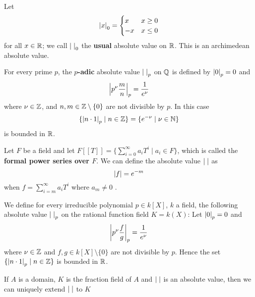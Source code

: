 \documentclass[11pt]{article}
\begin{document}
\begin{examplle}[]
Let
\begin{equation*}
\abs{x}_0=
\begin{cases}
x&x\ge 0\\
-x&x\le 0
\end{cases}
\end{equation*}
for all \(x\in\mathbb{R}\); we call \(\abs{\;}_0\) the \textbf{usual} absolute value on \(\mathbb{R}\). This is an
archimedean absolute value.
\end{examplle}

\begin{examplle}[]
For every prime \(p\), the \textbf{\(p\)-adic} absolute value \(\abs{\;}_p\) on \(\mathbb{Q}\) is defined by
\(\abs{0}_p=0\) and
\begin{equation*}
\abs{p^\nu\frac{m}{n}}_p=\frac{1}{e^\nu}
\end{equation*}
where \(\nu\in\mathbb{Z}\), and \(n,m\in\mathbb{Z}\setminus\{0\}\) are not divisible
by \(p\). In this case
\begin{equation*}
\{\abs{n\cdot 1}_p\mid n\in\Z\}=\{e^{-\nu}\mid\nu\in\N\}
\end{equation*}
is bounded in \(\mathbb{R}\).
\end{examplle}

\begin{examplle}[]
Let \(F\) be a field and let \(F[[T]]=\{\sum_{i=0}^\infty a_iT^i\mid a_i\in F\}\), which is called
the \textbf{formal power series over \(F\)}. We can define the absolute value \(\abs{\;}\) as
\begin{equation*}
\abs{f}=e^{-m}
\end{equation*}
when \(f=\sum_{i=m}^\infty a_iT^i\) where \(a_m\neq 0\) .
\end{examplle}

\begin{examplle}[]
\label{e1.1.4}
We define for every irreducible polynomial \(p\in k[X]\), \(k\) a field, the following absolute
value \(\abs{\;}_p\) on the rational function field \(K=k(X)\):
Let \(\abs{0}_p=0\) and
\begin{equation*}
\abs{p^\nu\frac{f}{g}}_p=\frac{1}{e^\nu}
\end{equation*}
where \(\nu\in\mathbb{Z}\) and \(f,g\in k[X]\setminus\{0\}\) are not divisible by \(p\). Hence the
set \(\{\abs{n\cdot 1}_p\mid n\in\Z\}\) is bounded in \(\mathbb{R}\).
\end{examplle}

\begin{proposition}[]
If \(A\) is a domain, \(K\) is the fraction field of \(A\) and \(\abs{\;}\) is an absolute
value, then we can uniquely extend \(\abs{\;}\) to \(K\)
\end{proposition}
\end{document}
